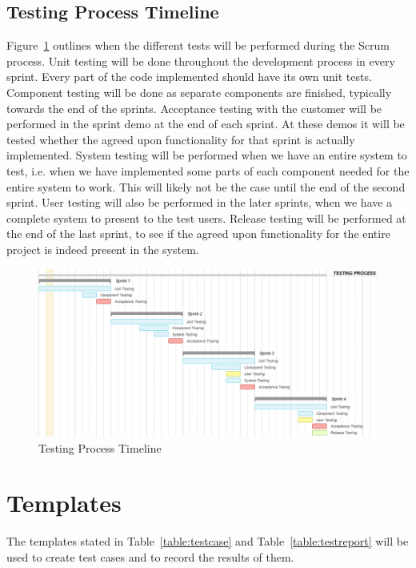 \subsection{Testing Process Timeline}
Figure~\ref{figure:testOutline} outlines when the different tests will be performed during the Scrum process. Unit testing will be done throughout the development process in every sprint. Every part of the code implemented should have its own unit tests. Component testing will be done as separate components are finished, typically towards the end of the sprints. Acceptance testing with the customer will be performed in the sprint demo at the end of each sprint. At these demos it will be tested whether the agreed upon functionality for that sprint is actually implemented. System testing will be performed when we have an entire system to test, i.e. when we have implemented some parts of each component needed for the entire system to work. This will likely not be the case until the end of the second sprint. User testing will also be performed in the later sprints, when we have a complete system to present to the test users. Release testing will be performed at the end of the last sprint, to see if the agreed upon functionality for the entire project is indeed present in the system.

\begin{figure}
\centering
\includegraphics[width=6in]{image/testingProcess.png}
\caption{Testing Process Timeline}
\label{figure:testOutline}
\end{figure}

\section{Templates}
The templates stated in Table~\ref{table:testcase} and Table~\ref{table:testreport} will be used to create test cases and to record the results of them.


